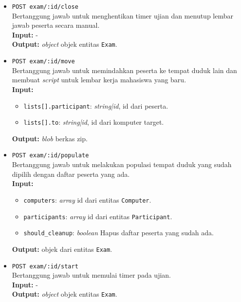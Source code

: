 \begin{itemize}
        \item \texttt{POST exam/:id/close} \\
            Bertanggung jawab untuk menghentikan timer ujian dan menutup lembar
            jawab peserta secara manual.\\
            \textbf{Input:} -\\
            \textbf{Output:} \textit{object} objek entitas \texttt{Exam}.
            
        \item \texttt{POST exam/:id/move} \\
            Bertanggung jawab untuk memindahkan peserta ke tempat duduk lain dan
            membuat \textit{script} untuk lembar kerja mahasiswa yang baru.\\
            \textbf{Input:} \begin{itemize}
                \item \texttt{lists[].participant}: \textit{string|id}, id dari
                peserta.
                \item \texttt{lists[].to}: \textit{string|id}, id dari komputer
                target.
            \end{itemize}
            \textbf{Output:} \textit{blob} berkas zip.
            
        \item \texttt{POST exam/:id/populate} \\
            Bertanggung jawab untuk melakukan populasi tempat duduk yang sudah
            dipilih dengan daftar peserta yang ada.\\
            \textbf{Input:} \begin{itemize}
                \item \texttt{computers}: \textit{array} id dari entitas
                    \texttt{Computer}.
                \item \texttt{participants}: \textit{array} id dari entitas
                    \texttt{Participant}.
                \item \texttt{should\_cleanup}: \textit{boolean} Hapus daftar
                    peserta yang sudah ada.
            \end{itemize}
            \textbf{Output:} objek dari entitas \texttt{Exam}.
            
        \item \texttt{POST exam/:id/start} \\
            Bertanggung jawab untuk memulai timer pada ujian.\\
            \textbf{Input:} -\\
            \textbf{Output:} \textit{object} objek entitas \texttt{Exam}.
            

\end{itemize}
